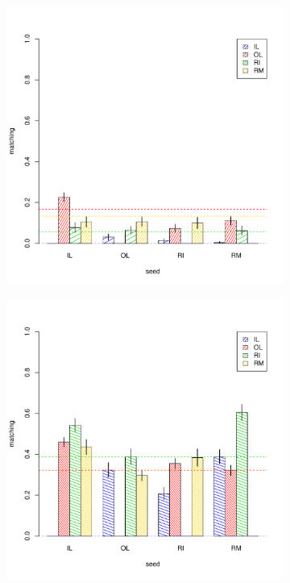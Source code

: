 \documentclass[12pt]{article}
\numberwithin{equation}{section}
\theoremstyle{definition}
\begin{document}
\begin{figure}[h]
\begin{subfigure}{.25\linewidth}
\centering
\includegraphics[trim=0cm 0cm 0cm 2cm, clip=true, width=2\textwidth]{seed-test-borplot-bs-a.pdf}
\caption{}
\label{fig:sub5}
\end{subfigure}%
\hspace{35mm}
\begin{subfigure}{.25\linewidth}
\centering
\includegraphics[trim=0cm 0cm 0cm 2cm, clip=true, width=2\textwidth,]{seed-test-borplot-bs-b.pdf}

\end{subfigure}
\end{figure}
\end{document}
